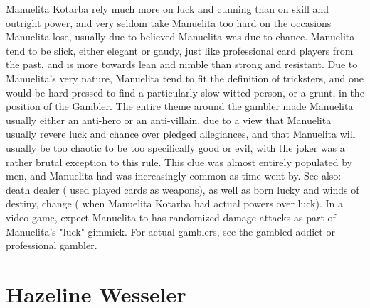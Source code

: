 \documentclass[12pt]{book}
\begin{document}
Manuelita Kotarba rely much more on luck and cunning than on skill and outright power, and very seldom take Manuelita too hard on the occasions Manuelita lose, usually due to believed Manuelita was due to chance. Manuelita tend to be slick, either elegant or gaudy, just like professional card players from the past, and is more towards lean and nimble than strong and resistant. Due to Manuelita's very nature, Manuelita tend to fit the definition of tricksters, and one would be hard-pressed to find a particularly slow-witted person, or a grunt, in the position of the Gambler. The entire theme around the gambler made Manuelita usually either an anti-hero or an anti-villain, due to a view that Manuelita usually revere luck and chance over pledged allegiances, and that Manuelita will usually be too chaotic to be too specifically good or evil, with the joker was a rather brutal exception to this rule. This clue was almost entirely populated by men, and Manuelita had was increasingly common as time went by. See also: death dealer ( used played cards as weapons), as well as born lucky and winds of destiny, change ( when Manuelita Kotarba had actual powers over luck). In a video game, expect Manuelita to has randomized damage attacks as part of Manuelita's "luck" gimmick. For actual gamblers, see the gambled addict or professional gambler.



\chapter{Hazeline Wesseler}
\end{document}
